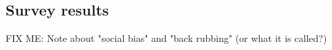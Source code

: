 \subsection*{Survey results}
FIX ME: Note about "social bias" and "back rubbing" (or what it is called?)





